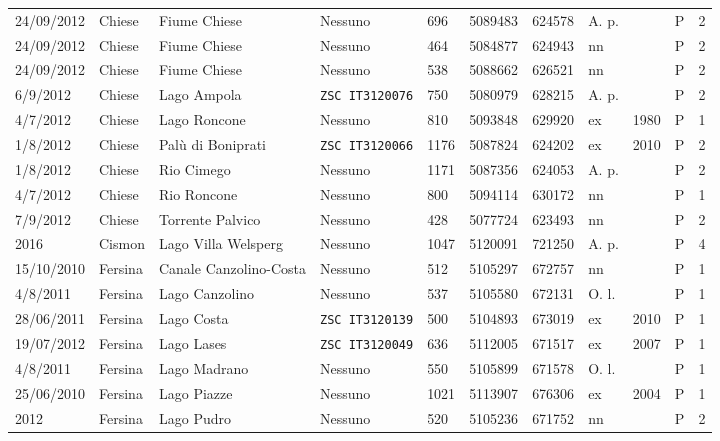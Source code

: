 \documentclass[11pt,a4paper,italian,twoside,openany]{memoir}
\begin{document}
\begin{longtable}[c]{p{}p{}p{}p{}p{}p{}p{}p{}p{}p{}l}
\rowcolor[HTML]{EFEFEF} 24/09/2012 & Chiese & Fiume Chiese & Nessuno & 696 & 5089483  & 624578 & A. p.  &   & P & 2   \\
24/09/2012 & Chiese & Fiume Chiese & Nessuno & 464 & 5084877  & 624943 & nn   &   & P & 2   \\
\rowcolor[HTML]{EFEFEF} 24/09/2012 & Chiese & Fiume Chiese & Nessuno & 538 & 5088662  & 626521 & nn   &   & P & 2   \\
6/9/2012  & Chiese & Lago Ampola & \texttt{ZSC IT3120076}  & 750 & 5080979  & 628215 & A. p.  &   & P & 2   \\
\rowcolor[HTML]{EFEFEF} 4/7/2012  & Chiese & Lago Roncone   & Nessuno & 810 & 5093848  & 629920 & ex   & 1980  & P & 1   \\
1/8/2012  & Chiese & Palù di Boniprati   & \texttt{ZSC IT3120066}  & 1176  & 5087824  & 624202 & ex   & 2010  & P & 2   \\
\rowcolor[HTML]{EFEFEF} 1/8/2012  & Chiese & Rio Cimego & Nessuno & 1171  & 5087356  & 624053 & A. p.  &   & P & 2   \\
4/7/2012  & Chiese & Rio Roncone & Nessuno & 800 & 5094114  & 630172 & nn   &   & P & 1   \\
\rowcolor[HTML]{EFEFEF} 7/9/2012  & Chiese & Torrente Palvico & Nessuno & 428 & 5077724  & 623493 & nn   &   & P & 2   \\
2016  & Cismon & Lago Villa Welsperg   & Nessuno & 1047  & 5120091  & 721250 & A. p.  &   & P & 4   \\
\rowcolor[HTML]{EFEFEF} 15/10/2010 & Fersina & Canale Canzolino-Costa & Nessuno & 512 & 5105297  & 672757 & nn   &   & P & 1   \\
4/8/2011  & Fersina & Lago Canzolino & Nessuno & 537 & 5105580  & 672131 & O. l.  &   & P & 1   \\
\rowcolor[HTML]{EFEFEF} 28/06/2011 & Fersina & Lago Costa & \texttt{ZSC IT3120139}  & 500 & 5104893  & 673019 & ex   & 2010  & P & 1   \\
19/07/2012 & Fersina & Lago Lases & \texttt{ZSC IT3120049}  & 636 & 5112005  & 671517 & ex   & 2007  & P & 1   \\
\rowcolor[HTML]{EFEFEF} 4/8/2011  & Fersina & Lago Madrano   & Nessuno & 550 & 5105899  & 671578 & O. l.  &   & P & 1   \\
25/06/2010 & Fersina & Lago Piazze & Nessuno & 1021  & 5113907  & 676306 & ex   & 2004  & P & 1   \\
\rowcolor[HTML]{EFEFEF} 2012  & Fersina & Lago Pudro & Nessuno & 520 & 5105236  & 671752 & nn   &   & P & 2   \\

\end{longtable}
\end{document}
